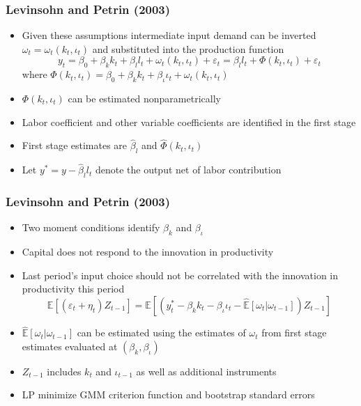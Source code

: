 \documentclass{beamer}
\begin{document}
\begin{frame}
\frametitle{Levinsohn and Petrin (2003)}
\begin{itemize}
	\item Given these assumptions intermediate input demand can be inverted $\omega_{t}=\omega_{t}(k_{t}, \iota_{t})$ and substituted into the production function
	\begin{equation}
		y_{t}=\beta_{0}+\beta_{k}k_{t}+\beta_{l}l_{t}+\omega_{t}(k_{t}, \iota_{t})+\varepsilon_{t}=\beta_{l}l_{t}+\Phi(k_{t}, \iota_{t})+\varepsilon_{t}
	\end{equation}
	where $\Phi(k_{t}, \iota_{t})=\beta_{0}+\beta_{k}k_{t}+\beta_{\iota}\iota_{t}+\omega_{t}(k_{t}, \iota_{t})$
	\pause
	\item $\Phi(k_{t}, \iota_{t})$ can be estimated nonparametrically
	\item Labor coefficient and other variable coefficients are identified in the first stage
	\item First stage estimates are $\hat{\beta}_{l}$ and $\hat{\Phi}(k_{t}, \iota_{t})$ 
	\item Let $y^{*}=y-\hat{\beta}_{l}l_{t}$ denote the output net of labor contribution
\end{itemize}
\end{frame}


\begin{frame}
\frametitle{Levinsohn and Petrin (2003)}
\begin{itemize}
	\item Two moment conditions identify $\beta_{k}$ and $\beta_{\iota}$
	\item Capital does not respond to the innovation in productivity 
	\item Last period's input choice should not be correlated with the innovation in productivity this period
	\pause
	\begin{equation}
	\mathbb{E}[(\varepsilon_{t}+\eta_{t})Z_{t-1}]=\mathbb{E}[(y_{t}^{*}-\beta_{k}k_{t}-\beta_{\iota}\iota_{t}-\hat{\mathbb{E}}[\omega_{t}|\omega_{t-1}])Z_{t-1}]
	\end{equation}
	\pause
	\item $\hat{\mathbb{E}}[\omega_{t}|\omega_{t-1}]$ can be estimated using the estimates of $\omega_{t}$ from first stage estimates evaluated at $(\beta_{k}, \beta_{\iota})$
	\item $Z_{t-1}$ includes $k_{t}$ and $\iota_{t-1}$ as well as additional instruments
	\item LP minimize GMM criterion function and bootstrap standard errors 
\end{itemize}
\end{frame}
\end{document}
